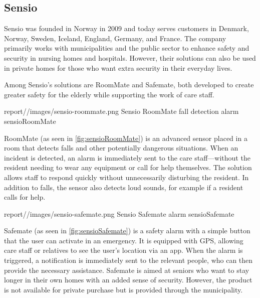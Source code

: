 \subsection{Sensio}

Sensio was founded in Norway in 2009 and today serves customers in Denmark, Norway, Sweden, Iceland, England, Germany, and France.
The company primarily works with municipalities and the public sector to enhance safety and security in nursing homes and hospitals. However, their solutions can also be used in private homes for those who want extra security in their everyday lives. 

Among Sensio’s solutions are RoomMate and Safemate, both developed to create greater safety for the elderly while supporting the work of care staff.



    {report//images/sensio-roommate.png}
    {Sensio RoomMate fall detection alarm}
    {sensioRoomMate}


RoomMate (as seen in \ref{fig:sensioRoomMate}) is an advanced sensor placed in a room that detects falls and other potentially dangerous situations. When an incident is detected, an alarm is immediately sent to the care staff—without the resident needing to wear any equipment or call for help themselves. The solution allows staff to respond quickly without unnecessarily disturbing the resident. In addition to falls, the sensor also detects loud sounds, for example if a resident calls for help.





    {report//images/sensio-safemate.png}
    {Sensio Safemate alarm}
    {sensioSafemate}


Safemate (as seen in \ref{fig:sensioSafemate}) is a safety alarm with a simple button that the user can activate in an emergency. It is equipped with GPS, allowing care staff or relatives to see the user’s location via an app. When the alarm is triggered, a notification is immediately sent to the relevant people, who can then provide the necessary assistance. Safemate is aimed at seniors who want to stay longer in their own homes with an added sense of security. However, the product is not available for private purchase but is provided through the municipality.
